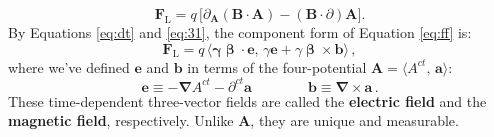 \documentclass[12pt]{article}
\renewcommand{\vv}[1]{\mathbf{#1}}
\newcommand{\vvbeta}{\bm{\upbeta}}
\newcommand{\del}{\boldsymbol{\nabla}}
\begin{document}
\begin{equation}\label{eq:lff}
\vv F_{\textrm{L}} = q \, \bigl[ \partialup_{\vv A} (\vv B \cdot \vv A) - (\vv B \cdot \partialup) \vv A \bigr] .\end{equation}
By Equations \ref{eq:dt} and \ref{eq:31}, the component form of Equation \ref{eq:ff} is:
\begin{equation}\label{eq:lfc}
\boxed{ \vv F_{\textrm{L}} = q \, \big \langle \vv \gamma \vvbeta \cdot \vv e , \, \gamma \vv e + \gamma \vvbeta \times \vv b \big \rangle } \, ,
\end{equation}
where we've defined $\vv e$ and $\vv b$ in terms of the four-potential $\vv A = \langle A^{ct}, \, \vv a \rangle$:
\begin{equation}\label{eq:eb}
\boxed{ \vv e \equiv - \del A^{ct} - \partial^{ct} \vv a \qquad \qquad \vv b \equiv \del \times \vv a } \, .
\end{equation}
These time-dependent three-vector fields are called the \textbf{electric field} and the \textbf{magnetic field}, respectively. Unlike $\vv A$, they are unique and measurable.
\end{document}

